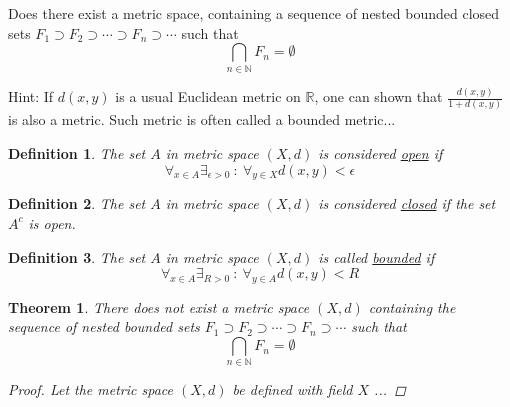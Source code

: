 \documentclass[]{article}
\newcommand{\R}{\mathbb{R}}
\newcommand{\N}{\mathbb{N}}
\newcommand{\st}{\ : \ }
\newtheorem{definition}{Definition}
\newtheorem{theorem}{Theorem}
\begin{document}
\newpage
\section{}
Does there exist a metric space, containing a sequence of nested bounded closed sets 
$F_1 \supset F_2 \supset \cdots \supset F_n \supset \cdots$
such that
\[
    \bigcap_{n \in \N} F_n = \emptyset
\]

Hint: If $d(x,y)$ is a usual Euclidean metric on $\R$, 
one can shown that $\frac{d(x,y)}{1 + d(x,y)}$ is also a metric.
Such metric is often called a bounded metric...

\begin{definition}
    The set $A$ in metric space $(X,d)$ is considered \emph{\underline{open}} if 
    \[
        \forall_{x \in A} \exists_{\epsilon > 0} \st \forall_{y \in X} d(x,y)<\epsilon
    \]
\end{definition}

\begin{definition}
    The set $A$ in metric space $(X,d)$ is considered \emph{\underline{closed}} if the set $A^c$ is open.
\end{definition}

\begin{definition}
    The set $A$ in metric space $(X,d)$ is called \emph{\underline{bounded}} if
    \[
        \forall_{x \in A} \exists_{R>0} \st \forall_{y\in A} d(x,y) < R
    \]
\end{definition}

\begin{theorem}
    There does not exist a metric space $(X,d)$ 
    containing the sequence of nested bounded sets 
    $F_1 \supset F_2 \supset \cdots \supset F_n \supset \cdots$
    such that \[
        \bigcap_{n \in \N} F_n = \emptyset
    \]
    \begin{proof}
        Let the metric space $(X,d)$ be defined with field $X$ ...

















    \end{proof}
\end{theorem}
\end{document}
